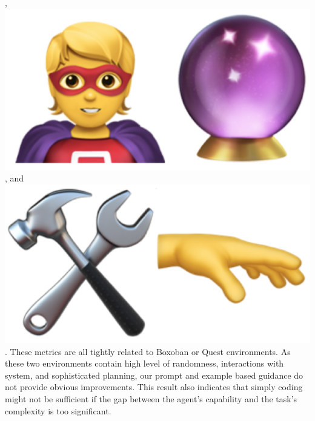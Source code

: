 \begin{flushleft}
	,
	\includegraphics[scale=0.05]{figs/emojis/mini_6.png}
	, and
	\includegraphics[scale=0.05]{figs/emojis/mini_8.png}
	. These metrics are all tightly related to Boxoban or Quest environments. As
	these two environments contain high level of randomness, interactions with system,
	and sophisticated planning, our prompt and example based guidance do not provide
	obvious improvements. This result also indicates that simply coding might not
	be sufficient if the gap between the agent's capability and the task's
	complexity is too significant.


\end{flushleft}
